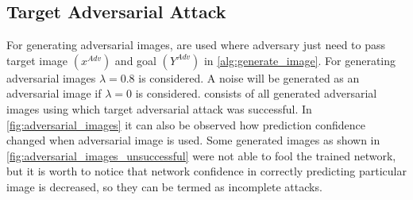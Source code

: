     \subsection*{Target Adversarial Attack}

        For generating adversarial images,  are used where  adversary just need to pass target image $(x^{Adv})$ and goal $(Y^{Adv})$ in \cref{alg:generate_image}. For generating adversarial images $\lambda = 0.8$ is considered. A noise will be generated as an adversarial image if $\lambda = 0$ is considered.  consists of all generated adversarial images using which target adversarial attack was successful. In \cref{fig:adversarial_images} it can also be observed how prediction confidence changed when adversarial image is used. Some generated images as shown in \cref{fig:adversarial_images_unsuccessful} were not able to fool the trained network, but it is worth to notice that network confidence in correctly predicting particular image is decreased, so they can be termed as incomplete attacks.    

